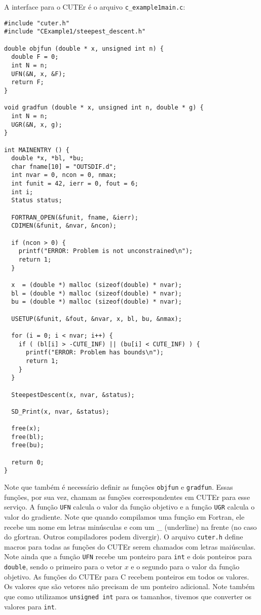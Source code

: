\documentclass[letterpaper,11pt]{article}
\numberwithin{equation}{section}
\begin{document}
A interface para o CUTEr é o arquivo \verb+c_example1main.c+:
\scriptsize
\begin{verbatim}
#include "cuter.h"
#include "CExample1/steepest_descent.h"

double objfun (double * x, unsigned int n) {
  double F = 0;
  int N = n;
  UFN(&N, x, &F);
  return F;
}

void gradfun (double * x, unsigned int n, double * g) {
  int N = n;
  UGR(&N, x, g);
}

int MAINENTRY () {
  double *x, *bl, *bu;
  char fname[10] = "OUTSDIF.d";
  int nvar = 0, ncon = 0, nmax;
  int funit = 42, ierr = 0, fout = 6;
  int i;
  Status status;

  FORTRAN_OPEN(&funit, fname, &ierr);
  CDIMEN(&funit, &nvar, &ncon);

  if (ncon > 0) {
    printf("ERROR: Problem is not unconstrained\n");
    return 1;
  }

  x  = (double *) malloc (sizeof(double) * nvar);
  bl = (double *) malloc (sizeof(double) * nvar);
  bu = (double *) malloc (sizeof(double) * nvar);

  USETUP(&funit, &fout, &nvar, x, bl, bu, &nmax);

  for (i = 0; i < nvar; i++) {
    if ( (bl[i] > -CUTE_INF) || (bu[i] < CUTE_INF) ) {
      printf("ERROR: Problem has bounds\n");
      return 1;
    }
  }

  SteepestDescent(x, nvar, &status);

  SD_Print(x, nvar, &status);

  free(x);
  free(bl);
  free(bu);

  return 0;
}
\end{verbatim}
\normalsize
Note que também é necessário definir as funções \verb+objfun+ e \verb+gradfun+. Essas
funções, por sua vez, chamam as funções correspondentes em CUTEr para esse serviço.
A função \verb+UFN+ calcula o valor da função objetivo e a função \verb+UGR+ calcula
o valor do gradiente. Note que quando compilamos uma função em Fortran, ele recebe um
nome em letras minúsculas e com um \_ (underline) na frente (no caso do gfortran. Outros
compiladores podem divergir). O arquivo \verb+cuter.h+ define macros para todas as funções
do CUTEr serem chamados com letras maiúsculas. Note ainda que a função \verb+UFN+ recebe
um ponteiro para \verb+int+ e dois ponteiros para \verb+double+, sendo o primeiro para o
vetor $x$ e o segundo para o valor da função objetivo. As funções do CUTEr para C recebem
ponteiros em todos os valores. Os valores que são vetores não precisam de um ponteiro 
adicional. Note também que como utilizamos \verb+unsigned int+ para os tamanhos, tivemos
que converter os valores para \verb+int+.
\end{document}
